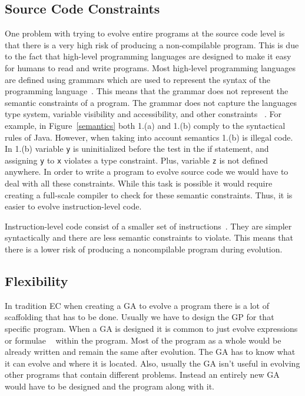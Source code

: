 \documentclass{sig-alternate}
\begin{document}
\subsection{Source Code Constraints}
One problem with trying to evolve entire programs at the source code level is that there is a very high risk of producing a non-compilable program. This is due to the fact that high-level programming languages are designed to make it easy for humans to read and write programs. Most high-level programming languages are defined using grammars which are used to represent the syntax of the programming language~\cite{Oracle:2013,Assembly:2010}. This means that the grammar does not represent the semantic constraints of a program. The grammar does not capture the languages type system, variable visibility and accessibility, and other constraints ~\cite{FINCH:2011}. For example, in Figure~\ref{semantics} both 1.(a) and 1.(b) comply to the syntactical rules of Java. However, when taking into account semantics 1.(b) is illegal code. In 1.(b) variable \texttt{y} is uninitialized before the test in the if statement, and assigning \texttt{y} to \texttt{x} violates a type constraint. Plus, variable \texttt{z} is not defined anywhere.  In order to write a program to evolve source code we would have to deal with all these constraints. While this task is possible it would require creating a full-scale compiler to check for these semantic constraints. Thus, it is easier to evolve instruction-level code. \par

Instruction-level code consist of a smaller set of instructions~\cite{Assembly:2010}. They are simpler syntactically and there are less semantic constraints to violate. This means that there is a lower risk of producing a noncompilable program during evolution. 

\subsection{Flexibility}
In tradition EC when creating a GA to evolve a program there is a lot of scaffolding that has to be done. Usually we have to design the GP for that specific program. When a GA is designed it is common to just evolve expressions or formulae ~\cite{FINCH:2011} within the program. Most of the program as a whole would be already written and remain the same after evolution. The GA has to know what it can evolve and where it is located. Also, usually the GA isn't useful in evolving other programs that contain different problems. Instead an entirely new GA would have to be designed and the program along with it.
\end{document}
